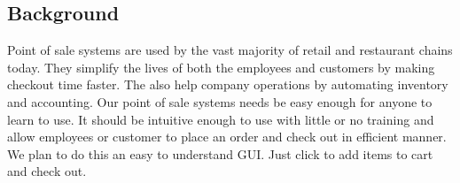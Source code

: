 \documentclass[10pt,conference,onecolumn,compsoc]{IEEEtran}
\begin{document}
%



\subsection{Background}



Point of sale systems are used by the vast majority of retail and restaurant chains today. They simplify the lives of both the employees and customers by making checkout time faster. The also help company operations by automating inventory and accounting. Our point of sale systems needs be easy enough for anyone to learn to use. It should be intuitive enough to use with little or no training and allow employees or customer to place an order and check out in efficient manner. We plan to do this an easy to understand GUI. Just click to add items to cart and check out. \\
\end{document}
